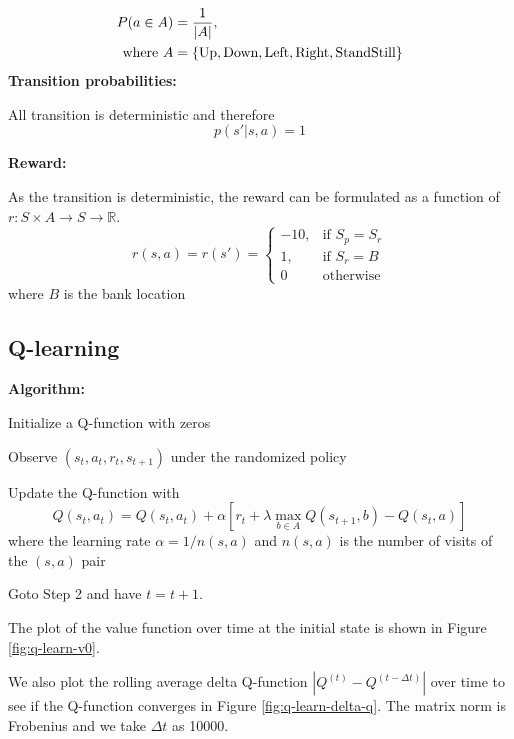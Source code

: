 \documentclass{article}
\begin{document}
\begin{align*}
  P(a \in A) &= \frac{1}{|A|}, \\
  \text{where} ~
  A &= \{\textup{Up},\textup{Down},\textup{Left},\textup{Right},\textup{StandStill}\}
\end{align*}
\textbf{Transition probabilities:}

All transition is deterministic and therefore
\begin{equation*}
  p(s' | s, a) = 1
\end{equation*}

\textbf{Reward:}

As the transition is deterministic,
the reward can be formulated as a function of $r: S\times A \rightarrow S \rightarrow \mathbb{R}$.
\begin{equation*}
  r(s, a) = r(s') =
\begin{cases}
    -10 ,& \text{if } S_p = S_r\\
    1,   & \text{if } S_r = B\\
    0    & \text{otherwise}
\end{cases}
\end{equation*}
where $B$ is the bank location

\subsection{Q-learning}

\textbf{Algorithm:}
\begin{steps}
  \item Initialize a Q-function with zeros
  \item Observe $(s_t, a_t, r_t, s_{t+1})$ under the randomized policy
  \item Update the Q-function with
  \begin{equation*}
    Q(s_t, a_t) = Q(s_t, a_t) + \alpha [r_t + \lambda\max_{b \in A} Q(s_{t+1}, b) - Q(s_t, a)]
  \end{equation*}
  where the learning rate $\alpha = 1 / n(s, a)$ and $n(s, a)$ is the number of visits
  of the $(s, a)$ pair
  \item Goto Step 2 and have $t = t + 1$.
\end{steps}

The plot of the value function over time at the initial state is shown in Figure
\ref{fig:q-learn-v0}.

We also plot the rolling average delta Q-function $|Q^{(t)} - Q^{(t-\Delta t)}|$ over time
to see if the Q-function converges in Figure \ref{fig:q-learn-delta-q}.
The matrix norm is Frobenius and
we take $\Delta t$ as 10000.
\end{document}
